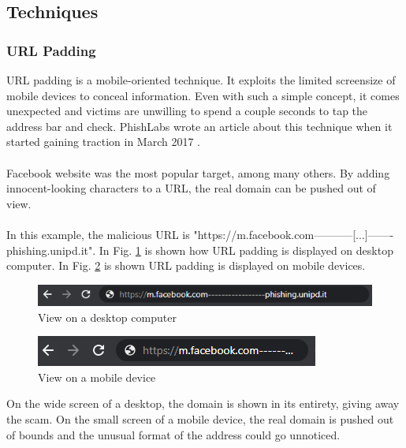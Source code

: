 \documentclass[a4paper]{article}
\begin{document}
\subsection{Techniques}

\subsubsection{URL Padding}

URL padding is a mobile-oriented technique. It exploits the limited screensize of mobile devices to conceal information. Even with such a simple concept, it comes unexpected and victims are unwilling to spend a couple seconds to tap the address bar and check. PhishLabs wrote an article about this technique when it started gaining traction in March 2017 \cite{article-url-padding}.
\\ \\
Facebook website was the most popular target, among many others. By adding innocent-looking characters to a URL, the real domain can be pushed out of view. 
\\ \\
In this example, the malicious URL is "https://m.facebook.com-----------[...]-------phishing.unipd.it". In Fig. \ref{padding-desktop} is shown how URL padding is displayed on desktop computer. In Fig. \ref{padding-mobile} is shown URL padding is displayed on mobile devices.

\smallskip

\begin{figure}[ht!]
\centering
\includegraphics[scale=0.7]{images/reports/url-padding-pc.PNG}
\caption{View on a desktop computer}
\label{padding-desktop}
\end{figure}

\begin{figure}[ht!]
\centering
\includegraphics[scale=0.7]{images/reports/url-padding-mobile.PNG}
\caption{View on a mobile device}
\label{padding-mobile}
\end{figure}

\noindent
On the wide screen of a desktop, the domain is shown in its entirety, giving away the scam. On the small screen of a mobile device, the real domain is pushed out of bounds and the unusual format of the address could go unnoticed.
\end{document}
